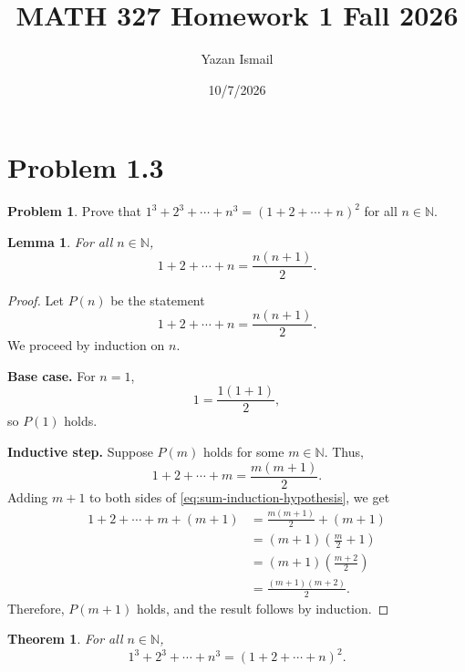 \documentclass{article}
\title{MATH 327 Homework 1 Fall 2026}
\author{Yazan Ismail}
\date{10/7/2026}
\newtheorem{lemma}{Lemma}
\newtheorem{theorem}{Theorem}
\theoremstyle{definition}
\newtheorem*{problem}{Problem}
\begin{document}
\maketitle

\section{Problem 1.3}

\begin{problem}
Prove that $1^3+2^3+\cdots+n^3=(1+2+\cdots+n)^2$ for all $n\in\mathbb{N}$.
\end{problem}

\begin{lemma}\label{lem:sum}
For all \(n\in\mathbb{N}\),
\[
1+2+\cdots+n=\frac{n(n+1)}{2}.
\]
\end{lemma}

\begin{proof}
Let \(P(n)\) be the statement
\[
1+2+\cdots+n=\frac{n(n+1)}{2}.
\]
We proceed by induction on \(n\).

\textbf{Base case.} For \(n=1\),
\[
1=\frac{1(1+1)}{2},
\]
so \(P(1)\) holds.

\textbf{Inductive step.} Suppose \(P(m)\) holds for some \(m\in\mathbb{N}\).
Thus,
\begin{equation}\label{eq:sum-induction-hypothesis}
1+2+\cdots+m=\frac{m(m+1)}{2}.
\end{equation}
Adding \(m+1\) to both sides of \eqref{eq:sum-induction-hypothesis}, we get
\begin{align*}
1+2+\cdots+m+(m+1)
&=\frac{m(m+1)}{2}+(m+1)\\
&=(m+1)\left(\frac{m}{2}+1\right)\\
&=(m+1)\left(\frac{m+2}{2}\right)\\
&=\frac{(m+1)(m+2)}{2}.
\end{align*}
Therefore, \(P(m+1)\) holds, and the result follows by induction.
\end{proof}

\begin{theorem}
For all \(n\in\mathbb{N}\),
\[
1^3+2^3+\cdots+n^3=(1+2+\cdots+n)^2.
\]
\end{theorem}
\end{document}

